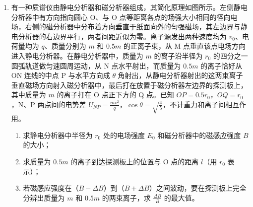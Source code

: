\documentclass[\gkver]{gaokaozhenti}
\begin{document}
\begin{enumerate}
{（2）①无磁场区间 $0\leq x<0.2\Um$，由题意知 $a=5v=25x$，由受力分析和牛顿第二定律可知外力与位移 $x$ 的关系为 $F=25xm+\mu mg\cos\theta+mg\sin\theta=0.96+2.5x$。②有磁场区间 $0.2\Um\leq x\leq0.8\Um$，金属棒受到的安培力为 $F_{A}=\frac{(Bl)^{2}v}{R}=0.6x$，由受力分析和牛顿第二定律可知外力与位移 $x$ 的关系为 $F=0.96+2.5x+0.6x=0.96+3.1x$。

（3）棒 ab 上升过程中克服安培力做功（梯形面积）为 $W_{A1}=\frac{0.6}{2}(x_{1}+x_{2})(x_{2}-x_{1})=0.18\UJ$；撤去外力后，棒 ab 上升的最大距离为 $s$，再次进入磁场时的速度为 $v'$，由动能定理得 $\frac{1}{2}mv^{2}=(mg\sin\theta+\mu mg\cos\theta)s$，$\frac{1}{2}mv'^{2}=(mg\sin\theta-\mu mg\cos\theta)s$，联立解得 $v'=2\Ums$；由于 $mg\sin\theta-\mu mg\cos\theta-\frac{(Bl)^{2}v'}{R}=0$，即金属棒受力平衡，故棒 ab 再次进入磁场后做匀速运动。下降过程中克服安培力做功为 $W_{A2}=\frac{(Bl)^{2}v'}{R}(x_{2}-x_{1})=0.144\UJ$，故电阻 R 产生的总焦耳热为 $Q=W_{A1}+W_{A2}=0.324\UJ$。
}

\item
有一种质谱仪由静电分析器和磁分析器组成，其简化原理如图所示。左侧静电分析器中有方向指向圆心 O、与 O 点等距离各点的场强大小相同的径向电场，右侧的磁分析器中分布着方向垂直于纸面向外的匀强磁场，其左边界与静电分析器的右边界平行，两者间距近似为零。离子源发出两种速度均为 $v_{0}$、电荷量均为 $q$、质量分别为 $m$ 和 $0.5m$ 的正离子束，从 M 点垂直该点电场方向进入静电分析器。在静电分析器中，质量为 $m$ 的离子沿半径为 $r_{0}$ 的四分之一圆弧轨道做匀速圆周运动，从 N 点水平射出，而质量为 $0.5m$ 的离子恰好从 ON 连线的中点 P 与水平方向成 $\theta$ 角射出，从静电分析器射出的这两束离子垂直磁场方向射入磁分析器中，最后打在放置于磁分析器左边界的探测板上，其中质量为 $m$ 的离子打在 O 点正下方的 Q 点。已知 $OP=0.5r_{0}$，$OQ=r_{0}$，N、P 两点间的电势差 $U_{NP}=\frac{mv^{2}}{q}$，$\cos\theta=\sqrt{\frac{4}{5}}$，不计重力和离子间相互作用。
\begin{enumerate}
	\item
	求静电分析器中半径为 $r_{0}$ 处的电场强度 $E_{0}$ 和磁分析器中的磁感应强度 $B$ 的大小；
	\item
	求质量为 $0.5m$ 的离子到达探测板上的位置与 O 点的距离 $l$（用 $r_{0}$ 表示）；
	\item
	若磁感应强度在（$B-\Delta B$）到（$B+\Delta B$）之间波动，要在探测板上完全分辨出质量为 $m$ 和 $0.5m$ 的两束离子，求 $\frac{{\Delta B}}{B}$ 的最大值。
\end{enumerate}
\end{enumerate}
\end{document}
